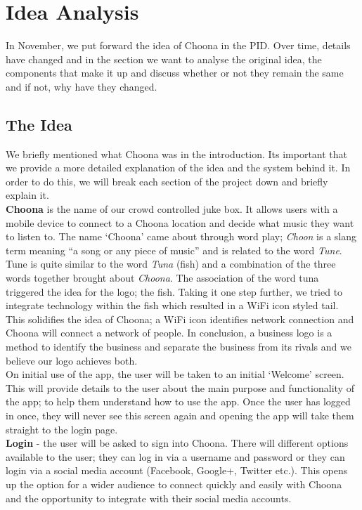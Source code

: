 \section{Idea Analysis}
In November, we put forward the idea of Choona in the PID.  Over time, details have changed and in the section we want to analyse the original idea, the components that make it up and discuss whether or not they remain the same and if not, why have they changed.  

\subsection{The Idea}
We briefly mentioned what Choona was in the introduction.  Its important that we provide a more detailed explanation of the idea and the system behind it.  In order to do this, we will break each section of the project down and briefly explain it.  \\
\textbf{Choona} is the name of our crowd controlled juke box.  It allows users with a mobile device to connect to a Choona location and decide what music they want to listen to.  The name `Choona' came about through word play; \emph{Choon} is a slang term meaning ``a song or any piece of music'' and is related to the word \emph{Tune}.  Tune is quite similar to the word \emph{Tuna} (fish) and a combination of the three words together brought about \emph{Choona}.  The association of the word tuna triggered the idea for the logo; the fish.  Taking it one step further, we tried to integrate technology within the fish which resulted in a WiFi icon styled tail.  This solidifies the idea of Choona; a WiFi icon identifies network connection and Choona will connect a network of people.  In conclusion, a business logo is a method to identify the business and separate the business from its rivals and we believe our logo achieves both. \\

On initial use of the app, the user will be taken to an initial `Welcome' screen.  This will provide details to the user about the main purpose and functionality of the app; to help them understand how to use the app.  Once the user has logged in once, they will never see this screen again and opening the app will take them straight to the login page.  \\

\textbf{Login} - the user will be asked to sign into Choona.  There will different options available to the user; they can log in via a username and password or they can login via a social media account (Facebook, Google+, Twitter etc.).  This opens up the option for a wider audience to connect quickly and easily with Choona and the opportunity to integrate with their social media accounts.  \\

